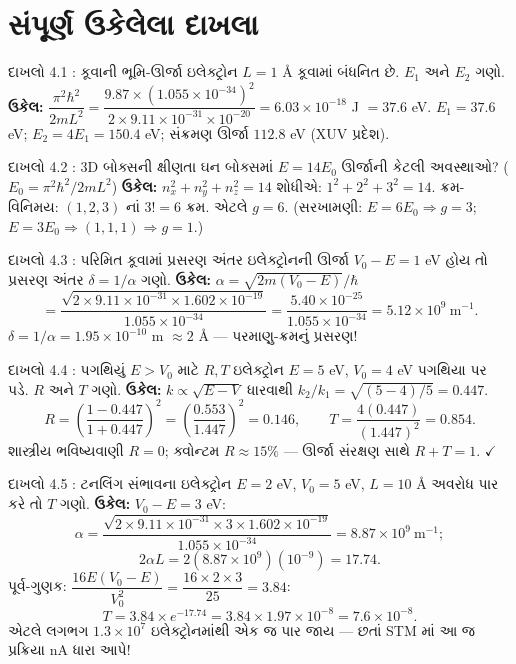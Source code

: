 \section{સંપૂર્ણ ઉકેલેલા દાખલા}
\begin{dahlo}{દાખલો 4.1 : કૂવાની ભૂમિ-ઊર્જા}
ઇલેક્ટ્રોન $L=1$ Å કૂવામાં બંધનિત છે. $E_1$ અને $E_2$ ગણો.
\tcblower
\textbf{ઉકેલ:} $\dfrac{\pi^{2}\hbar^{2}}{2mL^{2}}=\dfrac{9.87\times(1.055\times10^{-34})^{2}}{2\times9.11\times10^{-31}\times10^{-20}}=6.03\times10^{-18}$ J $=37.6$ eV.
$E_1=37.6$ eV; $E_2=4E_1=150.4$ eV; સંક્રમણ ઊર્જા $112.8$ eV (XUV પ્રદેશ).
\end{dahlo}

\begin{dahlo}{દાખલો 4.2 : 3D બોક્સની ક્ષીણતા}
ઘન બોક્સમાં $E=14E_0$ ઊર્જાની કેટલી અવસ્થાઓ? ($E_0=\pi^2\hbar^2/2mL^2$)
\tcblower
\textbf{ઉકેલ:} $n_x^{2}+n_y^{2}+n_z^{2}=14$ શોધીએ: $1^{2}+2^{2}+3^{2}=14$. ક્રમ-વિનિમય: $(1,2,3)$ નાં $3!=6$ ક્રમ. એટલે $g=6$.
(સરખામણી: $E=6E_0\Rightarrow g=3$; $E=3E_0\Rightarrow(1,1,1)\Rightarrow g=1$.)
\end{dahlo}

\begin{dahlo}{દાખલો 4.3 : પરિમિત કૂવામાં પ્રસરણ અંતર}
ઇલેક્ટ્રોનની ઊર્જા $V_0-E=1$ eV હોય તો પ્રસરણ અંતર $\delta=1/\alpha$ ગણો.
\tcblower
\textbf{ઉકેલ:} $\alpha=\sqrt{2m(V_0-E)}/\hbar$
\[
=\frac{\sqrt{2\times9.11\times10^{-31}\times1.602\times10^{-19}}}{1.055\times10^{-34}}
=\frac{5.40\times10^{-25}}{1.055\times10^{-34}}=5.12\times10^{9}\ \mathrm{m}^{-1}.
\]
$\delta=1/\alpha=1.95\times10^{-10}$ m $\approx2$ Å — પરમાણુ-ક્રમનું પ્રસરણ!
\end{dahlo}

\begin{dahlo}{દાખલો 4.4 : પગથિયું $E>V_0$ માટે $R,T$}
ઇલેક્ટ્રોન $E=5$ eV, $V_0=4$ eV પગથિયા પર પડે. $R$ અને $T$ ગણો.
\tcblower
\textbf{ઉકેલ:} $k\propto\sqrt{E-V}$ ધારવાથી $k_2/k_1=\sqrt{(5-4)/5}=0.447$.
\[
R=\left(\frac{1-0.447}{1+0.447}\right)^{2}=\left(\frac{0.553}{1.447}\right)^{2}=0.146,
\qquad
T=\frac{4(0.447)}{(1.447)^{2}}=0.854 .
\]
શાસ્ત્રીય ભવિષ્યવાણી $R=0$; ક્વોન્ટમ $R\approx15\%$ — ઊર્જા સંરક્ષણ સાથે $R+T=1$. $\checkmark$
\end{dahlo}

\begin{dahlo}{દાખલો 4.5 : ટનલિંગ સંભાવના}
ઇલેક્ટ્રોન $E=2$ eV, $V_0=5$ eV, $L=10$ Å અવરોધ પાર કરે તો $T$ ગણો.
\tcblower
\textbf{ઉકેલ:} $V_0-E=3$ eV:
\[
\alpha=\frac{\sqrt{2\times9.11\times10^{-31}\times3\times1.602\times10^{-19}}}{1.055\times10^{-34}}
=8.87\times10^{9}\ \mathrm{m}^{-1};
\]
\[
2\alpha L=2(8.87\times10^{9})(10^{-9})=17.74 .
\]
પૂર્વ-ગુણક: $\dfrac{16E(V_0-E)}{V_0^{2}}=\dfrac{16\times2\times3}{25}=3.84$:
\[
T=3.84\times e^{-17.74}=3.84\times1.97\times10^{-8}=7.6\times10^{-8}.
\]
એટલે લગભગ $1.3\times10^{7}$ ઇલેક્ટ્રોનમાંથી એક જ પાર જાય — છતાં STM માં આ જ પ્રક્રિયા nA ધારા આપે!
\end{dahlo}

